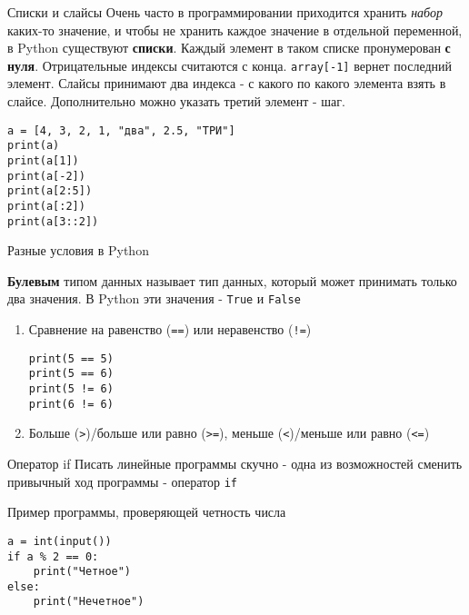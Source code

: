 \documentclass[hyperref=unicode, aspectratio=169]{beamer}
\begin{document}
\begin{frame}[fragile]{Списки и слайсы}
    Очень часто в программировании приходится хранить \textit{набор} каких-то значение, и чтобы не хранить каждое значение в отдельной переменной, в Python существуют \textbf{списки}. Каждый элемент в таком списке пронумерован \textbf{с нуля}. Отрицательные индексы считаются с конца. \texttt{array[-1]} вернет последний элемент. Слайсы принимают два индекса - с какого по какого элемента взять в слайсе. Дополнительно можно указать третий элемент - шаг.
    \begin{example}
        \begin{verbatim}
a = [4, 3, 2, 1, "два", 2.5, "ТРИ"]
print(a)
print(a[1])
print(a[-2])
print(a[2:5])
print(a[:2])
print(a[3::2])
        \end{verbatim}
    \end{example}
    
\end{frame}

\begin{frame}[fragile]{Разные условия в Python}
    \begin{definition}
        \textbf{Булевым} типом данных называет тип данных, который может принимать только два значения. В Python эти значения - \texttt{True} и \texttt{False}
    \end{definition}
    \begin{enumerate}
        \item Сравнение на равенство (\texttt{==}) или неравенство (\texttt{!=})
        \begin{example}
            \begin{verbatim}
print(5 == 5)
print(5 == 6)
print(5 != 6)
print(6 != 6)
            \end{verbatim}
        \end{example}
        \item Больше (\texttt{>})/больше или равно (\texttt{>=}), меньше (\texttt{<})/меньше или равно (\texttt{<=})
    \end{enumerate}
\end{frame}

\begin{frame}[fragile]{Оператор if}
    Писать линейные программы скучно - одна из возможностей сменить привычный ход программы - оператор \texttt{if}
    \begin{example}
        Пример программы, проверяющей четность числа
        \begin{verbatim}
a = int(input())
if a % 2 == 0:
    print("Четное")
else:
    print("Нечетное")
        \end{verbatim}    
    \end{example}
\end{frame}
\end{document}
